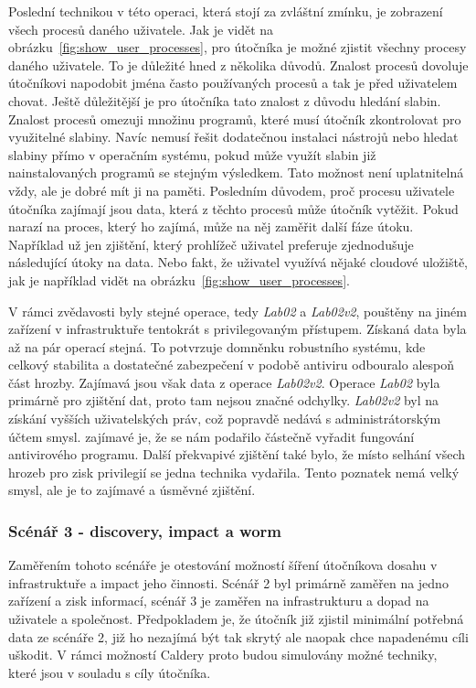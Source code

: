 
Poslední technikou v této operaci, která stojí za zvláštní zmínku, je zobrazení všech procesů daného uživatele.
Jak je vidět na obrázku~\ref{fig:show_user_processes}, pro útočníka je možné zjistit všechny procesy daného uživatele.
To je důležité hned z několika důvodů.
Znalost procesů dovoluje útočníkovi napodobit jména často používaných procesů a tak je před uživatelem chovat.
Ještě důležitější je pro útočníka tato znalost z důvodu hledání slabin.
Znalost procesů omezuji množinu programů, které musí útočník zkontrolovat pro využitelné slabiny.
Navíc nemusí řešit dodatečnou instalaci nástrojů nebo hledat slabiny přímo v operačním systému, pokud může využít slabin již nainstalovaných programů se stejným výsledkem.
Tato možnost není uplatnitelná vždy, ale je dobré mít ji na paměti.
Posledním důvodem, proč procesu uživatele útočníka zajímají jsou data, která z těchto procesů může útočník vytěžit.
Pokud narazí na proces, který ho zajímá, může na něj zaměřit další fáze útoku.
Například už jen zjištění, který prohlížeč uživatel preferuje zjednodušuje následující útoky na data.
Nebo fakt, že uživatel využívá nějaké cloudové uložiště, jak je například vidět na obrázku~\ref{fig:show_user_processes}.


V rámci zvědavosti byly stejné operace, tedy \textit{Lab02} a \textit{Lab02v2}, pouštěny na jiném zařízení v infrastruktuře tentokrát s privilegovaným přístupem.
Získaná data byla až na pár operací stejná.
To potvrzuje domněnku robustního systému, kde celkový stabilita a dostatečné zabezpečení v podobě antiviru odbouralo alespoň část hrozby.
Zajímavá jsou však data z operace \textit{Lab02v2}.
Operace \textit{Lab02} byla primárně pro zjištění dat, proto tam nejsou značné odchylky.
\textit{Lab02v2} byl na získání vyšších uživatelských práv, což popravdě nedává s administrátorským účtem smysl.
zajímavé je, že se nám podařilo částečně vyřadit fungování antivirového programu.
Další překvapivé zjištění také bylo, že místo selhání všech hrozeb pro zisk privilegií se jedna technika vydařila.
Tento poznatek nemá velký smysl, ale je to zajímavé a úsměvné zjištění.


\subsubsection{Scénář 3 - discovery, impact a worm}
Zaměřením tohoto scénáře je otestování možností šíření útočníkova dosahu v infrastruktuře a impact jeho činnosti.
Scénář 2 byl primárně zaměřen na jedno zařízení a zisk informací, scénář 3 je zaměřen na infrastrukturu a dopad na uživatele a společnost.
Předpokladem je, že útočník již zjistil minimální potřebná data ze scénáře 2, již ho nezajímá být tak skrytý ale naopak chce napadenému cíli uškodit.
V rámci možností Caldery proto budou simulovány možné techniky, které jsou v souladu s cíly útočníka.

